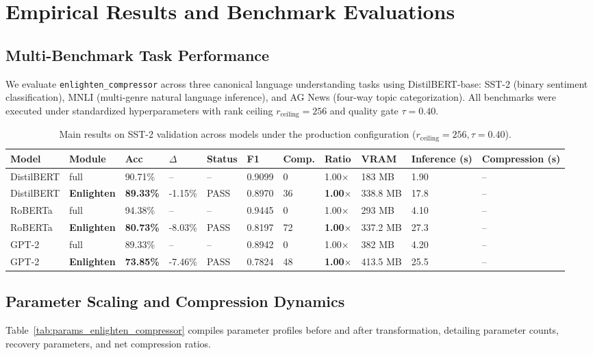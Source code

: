 \section{Empirical Results and Benchmark Evaluations}
\label{sec:results}

\subsection{Multi-Benchmark Task Performance}
We evaluate \texttt{enlighten\_compressor} across three canonical language understanding tasks using DistilBERT-base: SST-2 (binary sentiment classification), MNLI (multi-genre natural language inference), and AG News (four-way topic categorization). All benchmarks were executed under standardized hyperparameters with rank ceiling $r_{\mathrm{ceiling}} = 256$ and quality gate $\tau = 0.40$.

\begin{table}[t]
\centering
\small
\begin{tabular}{lllllllllll}
\toprule
\textbf{Model} & \textbf{Module} & \textbf{Acc} & \textbf{$\Delta$} & \textbf{Status} & \textbf{F1} & \textbf{Comp.} & \textbf{Ratio} & \textbf{VRAM} & \textbf{Inference (s)} & \textbf{Compression (s)} \\
\midrule
DistilBERT & full & 90.71\% & -- & -- & 0.9099 & 0 & 1.00$\times$ & 183 MB & 1.90 & -- \\
DistilBERT & \textbf{Enlighten} & \textbf{89.33\%} & -1.15\% & PASS & 0.8970 & 36 & \textbf{1.00$\times$} & 338.8 MB & 17.8 & -- \\
RoBERTa & full & 94.38\% & -- & -- & 0.9445 & 0 & 1.00$\times$ & 293 MB & 4.10 & -- \\
RoBERTa & \textbf{Enlighten} & \textbf{80.73\%} & -8.03\% & PASS & 0.8197 & 72 & \textbf{1.00$\times$} & 337.2 MB & 27.3 & -- \\
GPT-2 & full & 89.33\% & -- & -- & 0.8942 & 0 & 1.00$\times$ & 382 MB & 4.20 & -- \\
GPT-2 & \textbf{Enlighten} & \textbf{73.85\%} & -7.46\% & PASS & 0.7824 & 48 & \textbf{1.00$\times$} & 413.5 MB & 25.5 & -- \\
\bottomrule
\end{tabular}
\caption{Main results on SST-2 validation across models under the production configuration ($r_{\mathrm{ceiling}}=256, \tau=0.40$).}
\label{tab:main_sst2}
\end{table}

\subsection{Parameter Scaling and Compression Dynamics}
Table~\ref{tab:params_enlighten_compressor} compiles parameter profiles before and after transformation, detailing parameter counts, recovery parameters, and net compression ratios.

